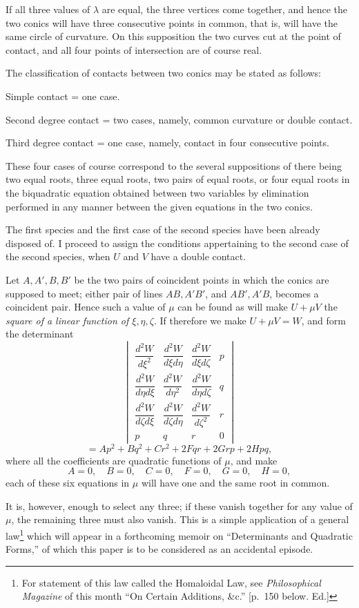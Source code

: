 \documentclass[11pt]{article}
\newcommand{\sourcepage}[1]{\marginpar{\scriptsize p.~#1}}
\begin{document}
If all three values of $\lambda$ are equal, the three vertices come together, and hence the two conics will have three consecutive points in common, that is, will have the same circle of curvature. On this supposition the two curves cut at the point of contact, and all four points of intersection are of course real.

\sourcepage{129}
The classification of contacts between two conics may be stated as follows:

Simple contact = one case.

Second degree contact = two cases, namely, common curvature or double contact.

Third degree contact = one case, namely, contact in four consecutive points.

These four cases of course correspond to the several suppositions of there being two equal roots, three equal roots, two pairs of equal roots, or four equal roots in the biquadratic equation obtained between two variables by elimination performed in any manner between the given equations in the two conics.

The first species and the first case of the second species have been already disposed of. I proceed to assign the conditions appertaining to the second case of the second species, when $U$ and $V$ have a double contact.

Let $A,A',B,B'$ be the two pairs of coincident points in which the conics are supposed to meet; either pair of lines $AB,A'B'$, and $AB',A'B$, becomes a coincident pair. Hence such a value of $\mu$ can be found as will make $U+\mu V$ the \emph{square of a linear function of $\xi,\eta,\zeta$}. If therefore we make $U+\mu V=W$, and form the determinant
\[
\begin{vmatrix}
\dfrac{d^2W}{d\xi^2}&\dfrac{d^2W}{d\xi d\eta}&\dfrac{d^2W}{d\xi d\zeta}&p\\[0.7em]
\dfrac{d^2W}{d\eta d\xi}&\dfrac{d^2W}{d\eta^2}&\dfrac{d^2W}{d\eta d\zeta}&q\\[0.7em]
\dfrac{d^2W}{d\zeta d\xi}&\dfrac{d^2W}{d\zeta d\eta}&\dfrac{d^2W}{d\zeta^2}&r\\[0.7em]
p&q&r&0
\end{vmatrix}
\]
\[
=Ap^2+Bq^2+Cr^2+2Fqr+2Grp+2Hpq,
\]
where all the coefficients are quadratic functions of $\mu$, and make
\[
A=0,\quad B=0,\quad C=0,\quad F=0,\quad G=0,\quad H=0,
\]
each of these six equations in $\mu$ will have one and the same root in common.

It is, however, enough to select any three; if these vanish together for any value of $\mu$, the remaining three must also vanish. This is a simple application of a general law\footnote{For statement of this law called the Homaloidal Law, see \emph{Philosophical Magazine} of this month ``On Certain Additions, \&c.'' [p.~150 below. Ed.]} which will appear in a forthcoming memoir on ``Determinants and Quadratic Forms,'' of which this paper is to be considered as an accidental episode.
\end{document}
